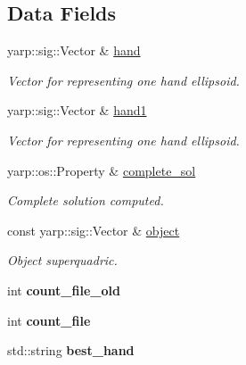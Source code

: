 \subsection*{Data Fields}
\begin{DoxyCompactItemize}
\item 
yarp\+::sig\+::\+Vector \& \hyperlink{classGraspComputation_a180a48b0a2d730ba28545a18d9f0f7fc}{hand}\label{classGraspComputation_a180a48b0a2d730ba28545a18d9f0f7fc}

\begin{DoxyCompactList}\small\item\em Vector for representing one hand ellipsoid. \end{DoxyCompactList}\item 
yarp\+::sig\+::\+Vector \& \hyperlink{classGraspComputation_a8577b68dddb60360dc5ecd1b87440297}{hand1}\label{classGraspComputation_a8577b68dddb60360dc5ecd1b87440297}

\begin{DoxyCompactList}\small\item\em Vector for representing one hand ellipsoid. \end{DoxyCompactList}\item 
yarp\+::os\+::\+Property \& \hyperlink{classGraspComputation_a2a53b7cb2bd19461860d41953bf92c59}{complete\+\_\+sol}\label{classGraspComputation_a2a53b7cb2bd19461860d41953bf92c59}

\begin{DoxyCompactList}\small\item\em Complete solution computed. \end{DoxyCompactList}\item 
const yarp\+::sig\+::\+Vector \& \hyperlink{classGraspComputation_a191eeabb17147b0d091332008fc923c8}{object}\label{classGraspComputation_a191eeabb17147b0d091332008fc923c8}

\begin{DoxyCompactList}\small\item\em Object superquadric. \end{DoxyCompactList}\item 
int {\bfseries count\+\_\+file\+\_\+old}\label{classGraspComputation_a7c13a764201910023cd0ca2800224f4a}

\item 
int {\bfseries count\+\_\+file}\label{classGraspComputation_ad811834d2f0289c1413f0c549205c2f9}

\item 
std\+::string {\bfseries best\+\_\+hand}\label{classGraspComputation_a429ee80f2e9aa3717cf4566cc638b0da}


\end{DoxyCompactItemize}
